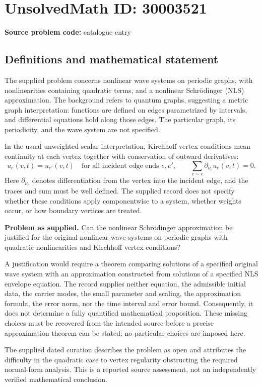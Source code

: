 \documentclass[11pt]{article}
\begin{document}
\section*{UnsolvedMath ID: 30003521}
\textbf{Source problem code:} catalogue entry
\subsection{Definitions and mathematical statement}
The supplied problem concerns nonlinear wave systems on periodic graphs, with nonlinearities containing quadratic terms, and a nonlinear Schr\"odinger (NLS) approximation. The background refers to quantum graphs, suggesting a metric graph interpretation: functions are defined on edges parametrized by intervals, and differential equations hold along those edges. The particular graph, its periodicity, and the wave system are not specified.

In the usual unweighted scalar interpretation, Kirchhoff vertex conditions mean continuity at each vertex together with conservation of outward derivatives:
\[
 u_e(v,t)=u_{e'}(v,t)\quad\text{for all incident edge ends }e,e',
 \qquad
 \sum_{e\sim v}\partial_{\nu_e}u_e(v,t)=0.
\]
Here \(\partial_{\nu_e}\) denotes differentiation from the vertex into the incident edge, and the traces and sum must be well defined. The supplied record does not specify whether these conditions apply componentwise to a system, whether weights occur, or how boundary vertices are treated.

\textbf{Problem as supplied.} Can the nonlinear Schr\"odinger approximation be justified for the original nonlinear wave systems on periodic graphs with quadratic nonlinearities and Kirchhoff vertex conditions?

A justification would require a theorem comparing solutions of a specified original wave system with an approximation constructed from solutions of a specified NLS envelope equation. The record supplies neither equation, the admissible initial data, the carrier modes, the small parameter and scaling, the approximation formula, the error norm, nor the time interval and error bound. Consequently, it does not determine a fully quantified mathematical proposition. These missing choices must be recovered from the intended source before a precise approximation theorem can be stated; no particular choices are imposed here.

The supplied dated curation describes the problem as open and attributes the difficulty in the quadratic case to vertex regularity obstructing the required normal-form analysis. This is a reported source assessment, not an independently verified mathematical conclusion.
\end{document}
